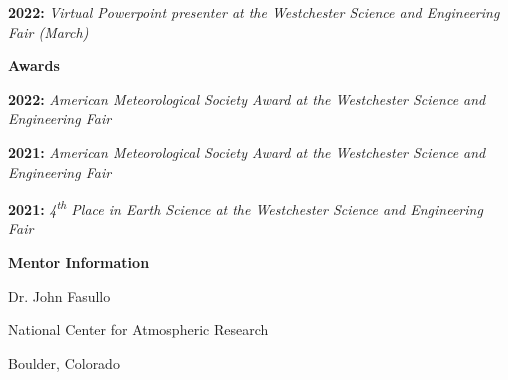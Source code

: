\documentclass[11pt]{article}
\begin{document}
\textbf{2022:} \emph{Virtual Powerpoint presenter at the Westchester Science and Engineering Fair (March)}

\begin{center}
\textbf{Awards}
\end{center}

\textbf{2022:} \emph{American Meteorological Society Award at the Westchester Science and Engineering Fair}

\textbf{2021:} \emph{American Meteorological Society Award at the Westchester Science and Engineering Fair}

\textbf{2021:} \emph{4\textsuperscript{th} Place in Earth Science at the Westchester Science and Engineering Fair}

\begin{center}
\textbf{Mentor Information}

Dr. John Fasullo

National Center for Atmospheric Research

Boulder, Colorado
\end{center}
\end{document}
